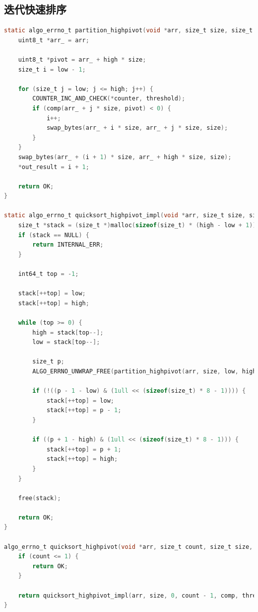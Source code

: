 \documentclass[a4paper]{article}
\begin{document}
\subsection{迭代快速排序}

\begin{lstlisting}[language=C]
static algo_errno_t partition_highpivot(void *arr, size_t size, size_t low, size_t high, comp_t comp, uint64_t threshold, uint64_t *counter, size_t *out_result) {
    uint8_t *arr_ = arr;

    uint8_t *pivot = arr_ + high * size;
    size_t i = low - 1;

    for (size_t j = low; j <= high; j++) {
        COUNTER_INC_AND_CHECK(*counter, threshold);
        if (comp(arr_ + j * size, pivot) < 0) {
            i++;
            swap_bytes(arr_ + i * size, arr_ + j * size, size);
        }
    }
    swap_bytes(arr_ + (i + 1) * size, arr_ + high * size, size);
    *out_result = i + 1;

    return OK;
}

static algo_errno_t quicksort_highpivot_impl(void *arr, size_t size, size_t low, size_t high, comp_t comp, uint64_t threshold, uint64_t *counter) {
    size_t *stack = (size_t *)malloc(sizeof(size_t) * (high - low + 1));
    if (stack == NULL) {
        return INTERNAL_ERR;
    }
    
    int64_t top = -1;

    stack[++top] = low;
    stack[++top] = high;

    while (top >= 0) {
        high = stack[top--];
        low = stack[top--];

        size_t p;
        ALGO_ERRNO_UNWRAP_FREE(partition_highpivot(arr, size, low, high, comp, threshold, counter, &p), stack);

        if (!((p - 1 - low) & (1ull << (sizeof(size_t) * 8 - 1)))) {
            stack[++top] = low;
            stack[++top] = p - 1;
        }

        if ((p + 1 - high) & (1ull << (sizeof(size_t) * 8 - 1))) {
            stack[++top] = p + 1;
            stack[++top] = high;
        }
    }

    free(stack);

    return OK;
}

algo_errno_t quicksort_highpivot(void *arr, size_t count, size_t size, comp_t comp, uint64_t threshold, uint64_t *out_counter) {
    if (count <= 1) {
        return OK;
    }

    return quicksort_highpivot_impl(arr, size, 0, count - 1, comp, threshold, out_counter);
}
\end{lstlisting}
\end{document}
